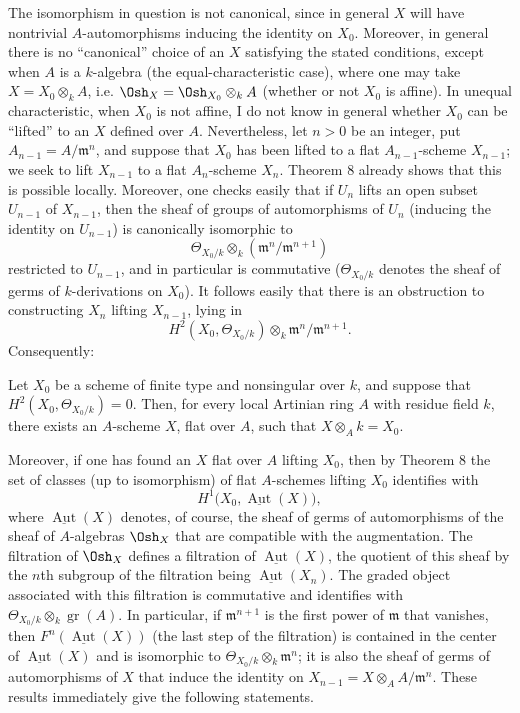 The isomorphism in question is not canonical, since in general $X$ will have
nontrivial $A$-automorphisms inducing the identity on $X_0$. Moreover, in
general there is no “canonical” choice of an $X$ satisfying the stated
conditions, except when $A$ is a $k$-algebra (the equal-characteristic case),
where one may take $X=X_0\otimes_k A$, i.e.
$\Osh_X=\Osh_{X_0}\otimes_k A$ (whether or not $X_0$ is affine). In unequal
characteristic, when $X_0$ is not affine, I do not know in general whether
$X_0$ can be “lifted” to an $X$ defined over $A$. Nevertheless, let $n>0$ be
an integer, put $A_{n-1}=A/\mathfrak m^n$, and suppose that $X_0$ has been
lifted to a flat $A_{n-1}$-scheme $X_{n-1}$; we seek to lift $X_{n-1}$ to a
flat $A_n$-scheme $X_n$. Theorem 8 already shows that this is possible
locally. Moreover, one checks easily that if $U_n$ lifts an open subset
$U_{n-1}$ of $X_{n-1}$, then the sheaf of groups of automorphisms of $U_n$
(inducing the identity on $U_{n-1}$) is canonically isomorphic to
\[
  \Theta_{X_0/k}\otimes_k(\mathfrak m^n/\mathfrak m^{n+1})
\]
restricted to $U_{n-1}$, and in particular is commutative
($\Theta_{X_0/k}$ denotes the sheaf of germs of $k$-derivations on $X_0$).
It follows easily that there is an obstruction to constructing $X_n$ lifting
$X_{n-1}$, lying in
\[
  H^2(X_0,\Theta_{X_0/k})\otimes_k
  \mathfrak m^n/\mathfrak m^{n+1}.
\]
Consequently:

 Let $X_0$ be a scheme of finite type and nonsingular
over $k$, and suppose that $H^2(X_0,\Theta_{X_0/k})=0$. Then, for every local
Artinian ring $A$ with residue field $k$, there exists an $A$-scheme $X$, flat
over $A$, such that $X\otimes_A k=X_0$.

Moreover, if one has found an $X$ flat over $A$ lifting $X_0$, then by Theorem
8 the set of classes (up to isomorphism) of flat $A$-schemes lifting $X_0$
identifies with
\[
  H^1\bigl(X_0,\underline{\operatorname{Aut}}(X)\bigr),
\]
where $\underline{\operatorname{Aut}}(X)$ denotes, of course, the sheaf of
germs of automorphisms of the sheaf of $A$-algebras $\Osh_X$ that are
compatible with the augmentation. The filtration of $\Osh_X$ defines a
filtration of $\underline{\operatorname{Aut}}(X)$, the quotient of this sheaf
by the $n$th subgroup of the filtration being
$\underline{\operatorname{Aut}}(X_n)$. The graded object associated with this
filtration is commutative and identifies with
$\Theta_{X_0/k}\otimes_k\operatorname{gr}(A)$. In particular, if
$\mathfrak m^{n+1}$ is the first power of $\mathfrak m$ that vanishes, then
$F^n(\underline{\operatorname{Aut}}(X))$ (the last step of the filtration) is
contained in the center of $\underline{\operatorname{Aut}}(X)$ and is
isomorphic to $\Theta_{X_0/k}\otimes_k\mathfrak m^n$; it is also the sheaf of
germs of automorphisms of $X$ that induce the identity on
$X_{n-1}=X\otimes_A A/\mathfrak m^n$. These results immediately give the
following statements.

